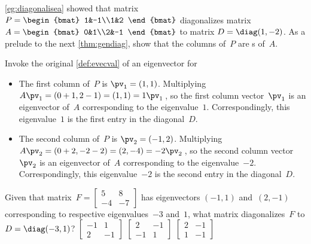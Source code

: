 \begin{example} 
\cref{eg:diagonalisea} showed that matrix \(P=\begin{bmat} 1&-1\\1&2 \end{bmat}\) diagonalizes matrix \(A=\begin{bmat} 0&1\\2&-1 \end{bmat}\) to matrix \(D=\diag(1,-2)\). 
As a prelude to the next \cref{thm:gendiag}, show that the columns of~\(P\) are s of~\(A\).
\begin{solution} Invoke the original \cref{def:evecval} of an eigenvector for 
\begin{itemize}
\item The first column of~\(P\) is \(\pv_1=(1,1)\).
Multiplying \(A\pv_1=(0+1,2-1)=(1,1)=1\pv_1\)\,, so the first column vector~\(\pv_1\) is an eigenvector of~\(A\) corresponding to the eigenvalue~\(1\).
Correspondingly, this eigenvalue~\(1\) is the first entry in the diagonal~\(D\).

\item The second column of~\(P\) is \(\pv_2=(-1,2)\).
Multiplying \(A\pv_2=(0+2,-2-2)=(2,-4)=-2\pv_2\)\,, so the second column vector~\(\pv_2\) is an eigenvector of~\(A\) corresponding to the eigenvalue~\(-2\).
Correspondingly, this eigenvalue~\(-2\) is the second entry in the diagonal~\(D\).
\aqed

\end{itemize}
\end{solution}
\end{example}




\begin{activity}
Given that matrix~\(F=\begin{bmatrix} 5&8\\-4&-7 \end{bmatrix}\) has eigenvectors \((-1,1)\) and~\((2,-1)\) corresponding to respective {eigenvalue}s~\(-3\) and~\(1\), what matrix diagonalizes~\(F\) to \(D=\diag(-3,1)\)?
{\(\begin{bmatrix} -1&1\\2&-1 \end{bmatrix}\)}
{\(\begin{bmatrix} 2&-1\\-1&1 \end{bmatrix}\)}
{\(\begin{bmatrix} 2&-1\\1&-1 \end{bmatrix}\)}
\end{activity}




